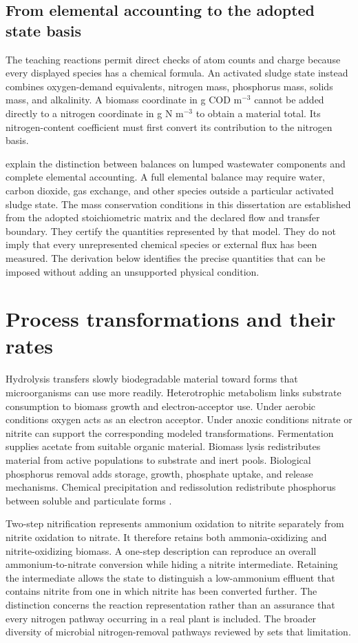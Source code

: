 \subsection{From elemental accounting to the adopted state basis}

The teaching reactions permit direct checks of atom counts and charge because every displayed species has a chemical formula. An activated sludge state instead combines oxygen-demand equivalents, nitrogen mass, phosphorus mass, solids mass, and alkalinity. A biomass coordinate in g COD m$^{-3}$ cannot be added directly to a nitrogen coordinate in g N m$^{-3}$ to obtain a material total. Its nitrogen-content coefficient must first convert its contribution to the nitrogen basis.

\citet{TakacsVanrolleghem2006} explain the distinction between balances on lumped wastewater components and complete elemental accounting. A full elemental balance may require water, carbon dioxide, gas exchange, and other species outside a particular activated sludge state. The mass conservation conditions in this dissertation are established from the adopted stoichiometric matrix and the declared flow and transfer boundary. They certify the quantities represented by that model. They do not imply that every unrepresented chemical species or external flux has been measured. The derivation below identifies the precise quantities that can be imposed without adding an unsupported physical condition.

\section{Process transformations and their rates}

Hydrolysis transfers slowly biodegradable material toward forms that microorganisms can use more readily. Heterotrophic metabolism links substrate consumption to biomass growth and electron-acceptor use. Under aerobic conditions oxygen acts as an electron acceptor. Under anoxic conditions nitrate or nitrite can support the corresponding modeled transformations. Fermentation supplies acetate from suitable organic material. Biomass lysis redistributes material from active populations to substrate and inert pools. Biological phosphorus removal adds storage, growth, phosphate uptake, and release mechanisms. Chemical precipitation and redissolution redistribute phosphorus between soluble and particulate forms \citep{Henze2006,Guerrero2011}.

Two-step nitrification represents ammonium oxidation to nitrite separately from nitrite oxidation to nitrate. It therefore retains both ammonia-oxidizing and nitrite-oxidizing biomass. A one-step description can reproduce an overall ammonium-to-nitrate conversion while hiding a nitrite intermediate. Retaining the intermediate allows the state to distinguish a low-ammonium effluent that contains nitrite from one in which nitrite has been converted further. The distinction concerns the reaction representation rather than an assurance that every nitrogen pathway occurring in a real plant is included. The broader diversity of microbial nitrogen-removal pathways reviewed by \citet{Duan2022} sets that limitation.

